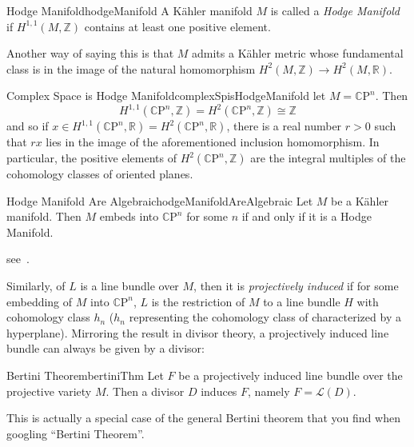 \documentclass{ut-thesis}
\newenvironment{Proof}[1][]
  {\begin{ProofTcb}[#1]}
  {\end{ProofTcb}}
\newcommand{\R}{{\mathbb{R}}}
\newcommand{\Z}{{\mathbb{Z}}}
\newcommand{\CL}{{\mathcal{L}}}
\newcommand{\CP}{{\mathbb{C}\mathrm{P}}}
\begin{document}
\begin{defn}{Hodge Manifold}{hodgeManifold}
  A K\"ahler manifold $M$ is called a \emph{Hodge Manifold} if $H^{1,1}(M, \Z)$ contains at least one positive
  element.
\end{defn}

Another way of saying this is that $M$ admits a K\"ahler metric whose fundamental class is in the image of the
natural homomorphism $H^2(M, \Z) \to H^2(M, \R)$.

\begin{example}{Complex Space is Hodge Manifold}{complexSpisHodgeManifold}
  let $M = \CP^n$. Then
  \[
    H^{1,1}(\CP^n, \Z) = H^2(\CP^n, \Z) \cong \Z
  \]
  and so if $x \in H^{1,1}(\CP^n, \R) = H^2(\CP^n, \R)$, there is a real number $r > 0$ such that $rx$ lies in
  the image of the aforementioned inclusion homomorphism. In particular, the positive elements of $H^2(\CP^n,
  \Z)$ are the integral multiples of the cohomology classes of oriented planes.
\end{example}

\begin{thm}{Hodge Manifold Are Algebraic}{hodgeManifoldAreAlgebraic}
  Let $M$ be a K\"ahler manifold. Then $M$ embeds into $\CP^n$ for some $n$ if and only if it is a Hodge
  Manifold.
\end{thm}

\begin{Proof}
  see~\cite{voisinHodgeTheoryComplex2002}.
\end{Proof}

Similarly, of $L$ is a line bundle over $M$, then it is \emph{projectively induced} if for some embedding of
$M$ into $\CP^n$, $L$ is the restriction of $M$ to a line bundle $H$ with cohomology class $h_n$ ($h_n$
representing the cohomology class of characterized by a hyperplane). Mirroring the result in divisor theory,
a projectively induced line bundle can always be given by a divisor:


\begin{thm}{Bertini Theorem}{bertiniThm}
  Let $F$ be a projectively induced line bundle over the projective variety $M$. Then a divisor
  $D$ induces $F$, namely $F = \CL(D)$.
\end{thm}

This is actually a special case of the general Bertini theorem that you find when googling ``Bertini
Theorem''.

\begin{Proof}
  \cite{voisinHodgeTheoryComplex2002}
\end{Proof}
\end{document}
